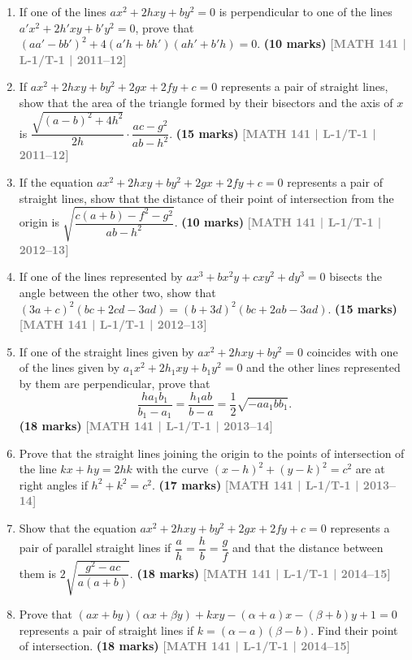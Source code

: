 \documentclass[12pt,a4paper]{article}
\newcommand{\yr}[1]{\hfill\textcolor{gray}{\small\textbf{[#1]}}}
\newcommand{\mk}[1]{\textcolor{orange!70!black}{\small\textbf{(#1 marks)}}}
\begin{document}
\begin{enumerate}
\item If one of the lines $ax^{2}+2hxy+by^{2}=0$ is perpendicular to one of the lines $a'x^{2}+2h'xy+b'y^{2}=0$, prove that $(aa'-bb')^{2}+4(a'h+bh')(ah'+b'h)=0$.
\mk{10} \yr{MATH 141 | L-1/T-1 | 2011--12}

\item If $ax^{2}+2hxy+by^{2}+2gx+2fy+c=0$ represents a pair of straight lines, show that the area of the triangle formed by their bisectors and the axis of $x$ is $\dfrac{\sqrt{(a-b)^{2}+4h^{2}}}{2h}\cdot\dfrac{ac-g^{2}}{ab-h^{2}}$.
\mk{15} \yr{MATH 141 | L-1/T-1 | 2011--12}

\item If the equation $ax^{2}+2hxy+by^{2}+2gx+2fy+c=0$ represents a pair of straight lines, show that the distance of their point of intersection from the origin is $\sqrt{\dfrac{c(a+b)-f^{2}-g^{2}}{ab-h^{2}}}$.
\mk{10} \yr{MATH 141 | L-1/T-1 | 2012--13}

\item If one of the lines represented by $ax^{3}+bx^{2}y+cxy^{2}+dy^{3}=0$ bisects the angle between the other two, show that $(3a+c)^{2}(bc+2cd-3ad)=(b+3d)^{2}(bc+2ab-3ad)$.
\mk{15} \yr{MATH 141 | L-1/T-1 | 2012--13}

\item If one of the straight lines given by $ax^{2}+2hxy+by^{2}=0$ coincides with one of the lines given by $a_{1}x^{2}+2h_{1}xy+b_{1}y^{2}=0$ and the other lines represented by them are perpendicular, prove that
\[
\frac{ha_{1}b_{1}}{b_{1}-a_{1}}=\frac{h_{1}ab}{b-a}=\frac{1}{2}\sqrt{-aa_{1}bb_{1}}.
\]
\mk{18} \yr{MATH 141 | L-1/T-1 | 2013--14}

\item Prove that the straight lines joining the origin to the points of intersection of the line $kx+hy=2hk$ with the curve $(x-h)^{2}+(y-k)^{2}=c^{2}$ are at right angles if $h^{2}+k^{2}=c^{2}$.
\mk{17} \yr{MATH 141 | L-1/T-1 | 2013--14}

\item Show that the equation $ax^{2}+2hxy+by^{2}+2gx+2fy+c=0$ represents a pair of parallel straight lines if $\dfrac{a}{h}=\dfrac{h}{b}=\dfrac{g}{f}$ and that the distance between them is $2\sqrt{\dfrac{g^{2}-ac}{a(a+b)}}$.
\mk{18} \yr{MATH 141 | L-1/T-1 | 2014--15}

\item Prove that $(ax+by)({\alpha}x+{\beta}y)+kxy-(\alpha+a)x-(\beta+b)y+1=0$ represents a pair of straight lines if $k=(\alpha-a)(\beta-b)$. Find their point of intersection.
\mk{18} \yr{MATH 141 | L-1/T-1 | 2014--15}


\end{enumerate}
\end{document}
